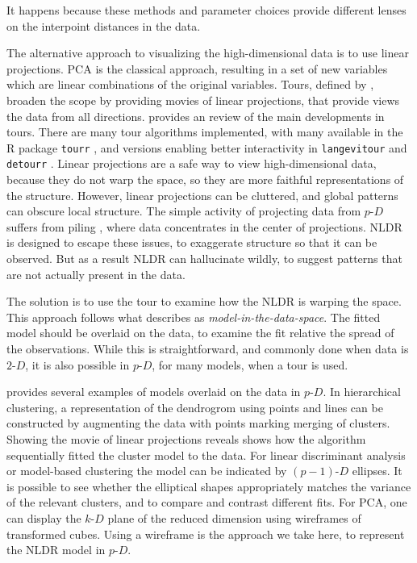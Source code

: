 \documentclass[
  12pt]{article}
\newcommand\pD{$p\text{-}D$}
\newcommand\kD{$k\text{-}D$}
\newcommand\gD{$2\text{-}D$}
\begin{document}
It happens because these methods and parameter choices provide different
lenses on the interpoint distances in the data.

The alternative approach to visualizing the high-dimensional data is to
use linear projections. PCA is the classical approach, resulting in a
set of new variables which are linear combinations of the original
variables. Tours, defined by \citet{lee2021}, broaden the scope by
providing movies of linear projections, that provide views the data from
all directions. \citet{lee2021} provides an review of the main
developments in tours. There are many tour algorithms implemented, with
many available in the R package \texttt{tourr} \citep{wickham2011}, and
versions enabling better interactivity in \texttt{langevitour}
\citep{harisson2024} and \texttt{detourr} \citep{hart2022}. Linear
projections are a safe way to view high-dimensional data, because they
do not warp the space, so they are more faithful representations of the
structure. However, linear projections can be cluttered, and global
patterns can obscure local structure. The simple activity of projecting
data from \pD{} suffers from piling \citep{laa2022}, where data
concentrates in the center of projections. NLDR is designed to escape
these issues, to exaggerate structure so that it can be observed. But as
a result NLDR can hallucinate wildly, to suggest patterns that are not
actually present in the data.

The solution is to use the tour to examine how the NLDR is warping the
space. This approach follows what \citet{wickham2015} describes as
\emph{model-in-the-data-space}. The fitted model should be overlaid on
the data, to examine the fit relative the spread of the observations.
While this is straightforward, and commonly done when data is \gD{}, it
is also possible in \pD{}, for many models, when a tour is used.

\citet{wickham2015} provides several examples of models overlaid on the
data in \pD{}. In hierarchical clustering, a representation of the
dendrogrom using points and lines can be constructed by augmenting the
data with points marking merging of clusters. Showing the movie of
linear projections reveals shows how the algorithm sequentially fitted
the cluster model to the data. For linear discriminant analysis or
model-based clustering the model can be indicated by \((p-1)\text{-}D\)
ellipses. It is possible to see whether the elliptical shapes
appropriately matches the variance of the relevant clusters, and to
compare and contrast different fits. For PCA, one can display the \kD{}
plane of the reduced dimension using wireframes of transformed cubes.
Using a wireframe is the approach we take here, to represent the NLDR
model in \pD{}.
\end{document}
